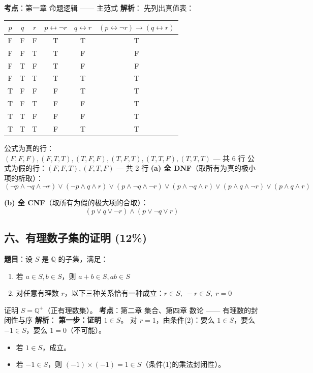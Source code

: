 \documentclass[10pt,a4paper,openany]{ctexbook}
\theoremstyle{definition}
\theoremstyle{remark}
\begin{document}
\textbf{考点}：第一章 命题逻辑 —— 主范式
\textbf{解析}：
先列出真值表：
\begin{center}
\begin{tabular}{cccccc}
\hline
$p$ & $q$ & $r$ & $p \leftrightarrow \neg r$ & $q \leftrightarrow r$ & $(p \leftrightarrow \neg r) \to (q \leftrightarrow r)$ \\ \hline
F & F & F & T & T & T \\
F & F & T & T & F & F \\
F & T & F & T & F & F \\
F & T & T & T & T & T \\
T & F & F & F & T & T \\
T & F & T & F & F & T \\
T & T & F & F & F & T \\
T & T & T & F & T & T \\
\hline
\end{tabular}

\end{center}

公式为真的行：$(F,F,F), (F,T,T), (T,F,F), (T,F,T), (T,T,F), (T,T,T)$ — 共 6 行
公式为假的行：$(F,F,T), (F,T,F)$ — 共 2 行
\textbf{(a) 全 DNF}（取所有为真的极小项的析取）：
\[
(\neg p \land \neg q \land \neg r) \lor (\neg p \land q \land r) \lor (p \land \neg q \land \neg r) \lor (p \land \neg q \land r) \lor (p \land q \land \neg r) \lor (p \land q \land r)
\]

\textbf{(b) 全 CNF}（取所有为假的极大项的合取）：
\[
(p \lor q \lor \neg r) \land (p \lor \neg q \lor r)
\]

\vspace{-2pt}

\subsection{六、有理数子集的证明 (12\%)}

\textbf{题目}：设 $S$ 是 $\mathbb{Q}$ 的子集，满足：
\begin{enumerate}
\item 若 $a \in S, b \in S$，则 $a + b \in S, ab \in S$
\item 对任意有理数 $r$，以下三种关系恰有一种成立：$r \in S,\; -r \in S,\; r = 0$

\end{enumerate}

证明 $S = \mathbb{Q}^+$（正有理数集）。
\textbf{考点}：第二章 集合、第四章 数论 —— 有理数的封闭性与序
\textbf{解析}：
\textbf{第一步：证明 $1 \in S$}。
对 $r = 1$，由条件(2)：要么 $1 \in S$，要么 $-1 \in S$，要么 $1 = 0$（不可能）。
\begin{itemize}
\item 若 $1 \in S$，成立。
\item 若 $-1 \in S$，则 $(-1) \times (-1) = 1 \in S$（条件(1)的乘法封闭性）。

\end{itemize}
\end{document}
